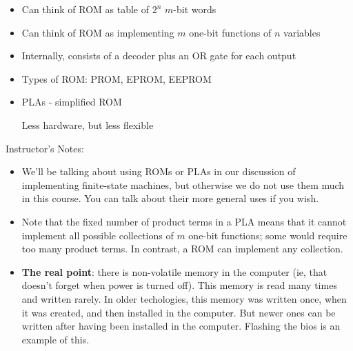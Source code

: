 \begin{frame}[fragile]
\begin{itemize}
	\item Can think of ROM as table of $2^n$ $m$-bit words
	\item Can think of ROM as implementing $m$ one-bit functions
	of $n$ variables
	\item Internally, consists of a decoder plus an OR gate for
	each output
	\item Types of ROM: PROM, EPROM, EEPROM
	\item PLAs - simplified ROM

		Less hardware, but less flexible
\end{itemize}
\end{frame}
\BNotes\ifnum{}
\begin{frame}[fragile]
Instructor's Notes:
\begin{itemize}
\item We'll be talking about using ROMs or PLAs in our discussion of
implementing finite-state machines, but otherwise we do not use them
much in this course. You can talk about their more general uses if you
wish. 
\item Note that the fixed number of product terms in a PLA means that
it cannot implement all possible collections of $m$ one-bit functions;
some would require too many product terms. In contrast, a ROM can implement
any collection.
\bigskip
\item {\bf The real point}: there is non-volatile memory in the computer (ie, that doesn't forget when power is turned off).  This memory is read many times and written rarely.  In older techologies, this memory was written once, when it was created, and then installed in the computer.  But newer ones can be written after having been installed in the computer.  Flashing the bios is an example of this.
\end{itemize}
\end{frame}
\fi\ENotes








